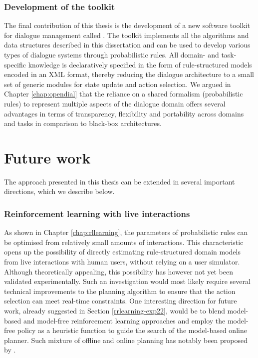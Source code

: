 

\subsubsection*{Development of the \opendial toolkit}

The final contribution of this thesis is the development of a new software toolkit for dialogue management called \opendial. The toolkit implements all the algorithms and data structures described in this dissertation and can be used to develop various types of dialogue systems through probabilistic rules. All domain- and task-specific knowledge is declaratively specified in the form of rule-structured models encoded in an XML format, thereby reducing the dialogue architecture to a small set of generic modules for state update and action selection.  We argued in Chapter \ref{chap:opendial} that the reliance on a shared   formalism (probabilistic rules) to represent multiple aspects of the dialogue domain offers several advantages in terms of transparency, flexibility and portability across domains and tasks in comparison to black-box architectures.

\section{Future work}

The approach presented in this thesis can be extended in several important directions, which we describe below. 

\subsubsection*{Reinforcement learning with live interactions}

As shown in Chapter \ref{chap:rllearning}, the parameters of probabilistic rules can be optimised from relatively small amounts of interactions.  This characteristic opens up the possibility of directly estimating rule-structured domain models from live interactions with human users, without relying on a user simulator.  Although theoretically appealing, this possibility has however not yet been validated experimentally. Such an investigation would most likely require several technical improvements to the planning algorithm to ensure that the action selection can meet real-time constraints. One interesting direction for future work, already suggested in Section \ref{rrlearning-exp22}, would be to blend model-based and model-free reinforcement learning approaches and employ the model-free policy as a heuristic function to guide the search of the model-based online planner.  Such mixture of offline and online planning has notably been proposed by \cite{RossC07}. 


